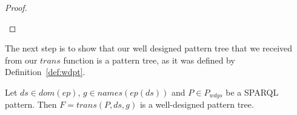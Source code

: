 \begin{proof}
\begin{enumerate}

	\end{enumerate}
\end{proof}

The next step is to show that our well designed pattern tree that we received
from our $trans$ function is a pattern tree, as it was defined by Definition~\ref{def:wdpt}.

\begin{lemma}
	Let $ds \in dom(ep)$, $g \in names(ep(ds))$ and $P \in P_{wdgs}$ be a SPARQL pattern.
	Then $F = trans(P,ds,g)$ is a well-designed pattern tree. 
\end{lemma}

